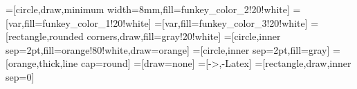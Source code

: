 \usetikzlibrary{arrows.meta}
\usetikzlibrary{backgrounds}
\usetikzlibrary{calc}
\usetikzlibrary{decorations.pathreplacing}
\usetikzlibrary{fit}
\usetikzlibrary{spy}
\pgfplotsset{compat=1.18}

=[circle,draw,minimum width=8mm,fill=funkey_color_2!20!white]
=[var,fill=funkey_color_1!20!white]
=[var,fill=funkey_color_3!20!white]
=[rectangle,rounded corners,draw,fill=gray!20!white]
=[circle,inner sep=2pt,fill=orange!80!white,draw=orange]
=[circle,inner sep=2pt,fill=gray]
=[orange,thick,line cap=round]
=[draw=none]
=[->,-{Latex}]
=[rectangle,draw,inner sep=0]
